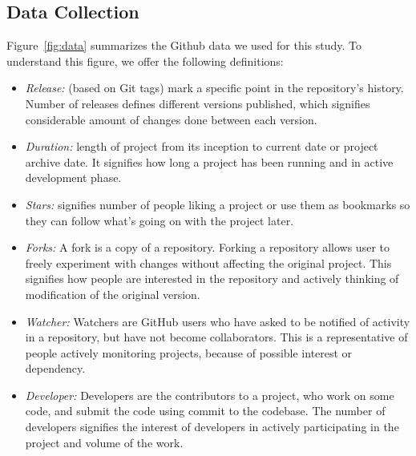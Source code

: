 \documentclass[smallextended]{svjour3}
\newcommand{\bi}{\begin{itemize}}
\newcommand{\ei}{\end{itemize}}
\newcommand{\fig}[1]{Figure~\ref{fig:#1}}
\begin{document}
\subsection{Data Collection}
\label{sec:Data Collections}
\fig{data} summarizes the Github data we used for
this study. 
To understand this figure, we offer the following definitions:
\bi
\item
{\em Release:} (based on Git tags)  mark a specific point in the repository's history. Number of releases defines different versions published, which signifies considerable amount of changes done between each version.
\item
{\em Duration:} length of project from its inception to current date or project archive date. It signifies how long a project has been running and in active development phase.
\item
{\em Stars:} signifies number of people liking a project or use them as bookmarks so they can follow what's going on with the project later.
\item
{\em Forks:} A fork is a copy of a repository. Forking a repository allows user to freely experiment with changes without affecting the original project. This signifies how people are interested in the repository and actively thinking of modification of the original version.
\item
{\em Watcher:} Watchers are GitHub users who have asked to be notified of activity in a repository, but have not become collaborators. This is a representative of people actively monitoring projects, because of possible interest or dependency.
\item
{\em Developer:} Developers are the contributors to a project, who work on some code, and submit the code using commit to the codebase. The number of developers signifies the interest of developers in actively participating in the project and volume of the work.
\ei
\end{document}
